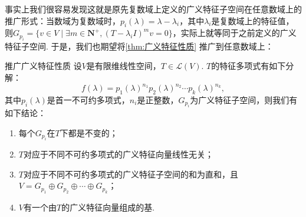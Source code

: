 事实上我们很容易发现这就是原先复数域上定义的广义特征子空间在任意数域上的推广形式：当数域为复数域时，$p_i(\lambda)=\lambda-\lambda_i$，其中$\lambda_i$是复数域上的特征值，则$G_{p_i}=\{v\in V\mid\exists m\in\mathbf{N}^+,(T-\lambda_iI)^mv=0\}$，实际上就等同于之前定义的广义特征子空间. 于是，我们也期望将\autoref{thm:广义特征性质} 推广到任意数域上：
\begin{theorem}{}{推广广义特征性质}
    设$V$是有限维线性空间，$T\in \mathcal{L}(V)$. $T$的特征多项式有如下分解：
    \[f(\lambda)=p_1(\lambda)^{n_1}p_2(\lambda)^{n_2}\cdots p_k(\lambda)^{n_k},\]
    其中$p_i(\lambda)$是首一不可约多项式，$n_i$是正整数，$G_{p_i}$为广义特征子空间，则我们有如下结论：
    \begin{enumerate}[label=(\arabic*)]
        \item 每个$G_{p_i}$在$T$下都是不变的；
        \item $T$对应于不同不可约多项式的广义特征向量线性无关；
        \item $T$对应于不同不可约多项式的广义特征子空间的和为直和，且$V=G_{p_1}\oplus G_{p_2}\oplus\cdots\oplus G_{p_k}$；
        \item $V$有一个由$T$的广义特征向量组成的基.
    \end{enumerate}
\end{theorem}
